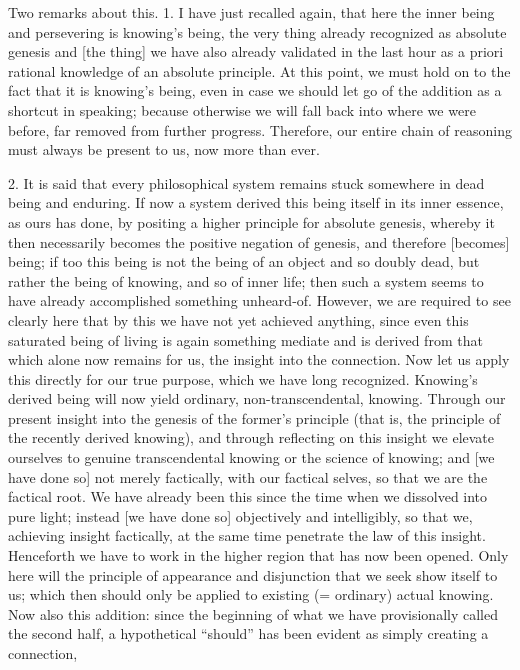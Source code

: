 Two remarks about this.
1. I have just recalled again,
that here the inner being and persevering is knowing's being,
the very thing already recognized as absolute genesis
and [the thing] we have also already validated in the last hour
as a priori rational knowledge of an absolute principle.
At this point, we must hold on to
the fact that it is knowing's being,
even in case we should let go of
the addition as a shortcut in speaking;
because otherwise we will fall back into
where we were before, far removed from further progress.
Therefore, our entire chain of reasoning
must always be present to us, now more than ever.

2. It is said that every philosophical system
remains stuck somewhere in dead being and enduring.
If now a system derived this being itself in its inner essence,
as ours has done, by positing a higher principle for absolute genesis,
whereby it then necessarily becomes the positive negation of genesis,
and therefore [becomes] being;
if too this being is not the being of an object and so doubly dead,
but rather the being of knowing, and so of inner life;
then such a system seems to have already
accomplished something unheard-of.
However, we are required to see clearly here that
by this we have not yet achieved anything,
since even this saturated being of living is
again something mediate and is derived from that
which alone now remains for us,
the insight into the connection.
Now let us apply this directly for our true purpose,
which we have long recognized.
Knowing's derived being will now yield
ordinary, non-transcendental, knowing.
Through our present insight into
the genesis of the former's principle
(that is, the principle of the recently derived knowing),
and through reflecting on this insight
we elevate ourselves to genuine transcendental knowing
or the science of knowing;
and [we have done so] not merely factically,
with our factical selves,
so that we are the factical root.
We have already been this since
the time when we dissolved into pure light;
instead [we have done so] objectively and intelligibly,
so that we, achieving insight factically,
at the same time penetrate the law of this insight.
Henceforth we have to work in the higher region
that has now been opened.
Only here will the principle of
appearance and disjunction
that we seek show itself to us;
which then should only be applied
to existing (= ordinary) actual knowing.
Now also this addition:
since the beginning of what we
have provisionally called the second half,
a hypothetical “should” has been evident
as simply creating a connection,
